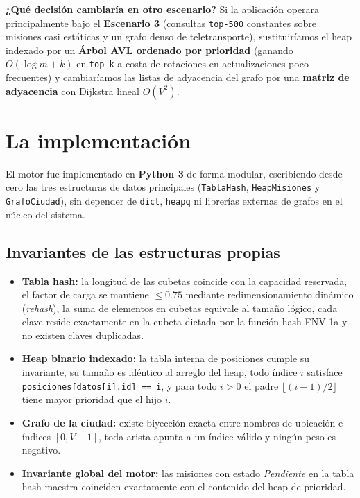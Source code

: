 \documentclass[11pt,a4paper]{article}
\begin{document}
\textbf{¿Qué decisión cambiaría en otro escenario?} Si la aplicación operara principalmente bajo el \textbf{Escenario 3} (consultas \texttt{top-500} constantes sobre misiones casi estáticas y un grafo denso de teletransporte), sustituiríamos el heap indexado por un \textbf{Árbol AVL ordenado por prioridad} (ganando $O(\log m + k)$ en \texttt{top-k} a costa de rotaciones en actualizaciones poco frecuentes) y cambiaríamos las listas de adyacencia del grafo por una \textbf{matriz de adyacencia} con Dijkstra lineal $O(V^2)$.

\section{La implementación}

El motor fue implementado en \textbf{Python 3} de forma modular, escribiendo desde cero las tres estructuras de datos principales (\texttt{TablaHash}, \texttt{HeapMisiones} y \texttt{GrafoCiudad}), sin depender de \texttt{dict}, \texttt{heapq} ni librerías externas de grafos en el núcleo del sistema.

\subsection{Invariantes de las estructuras propias}
\begin{itemize}
  \item \textbf{Tabla hash:} la longitud de las cubetas coincide con la capacidad reservada, el factor de carga se mantiene $\le 0.75$ mediante redimensionamiento dinámico (\textit{rehash}), la suma de elementos en cubetas equivale al tamaño lógico, cada clave reside exactamente en la cubeta dictada por la función hash FNV-1a y no existen claves duplicadas.
  \item \textbf{Heap binario indexado:} la tabla interna de posiciones cumple su invariante, su tamaño es idéntico al arreglo del heap, todo índice $i$ satisface \texttt{posiciones[datos[i].id] == i}, y para todo $i > 0$ el padre $\lfloor(i-1)/2\rfloor$ tiene mayor prioridad que el hijo $i$.
  \item \textbf{Grafo de la ciudad:} existe biyección exacta entre nombres de ubicación e índices $[0, V-1]$, toda arista apunta a un índice válido y ningún peso es negativo.
  \item \textbf{Invariante global del motor:} las misiones con estado \textit{Pendiente} en la tabla hash maestra coinciden exactamente con el contenido del heap de prioridad.
\end{itemize}
\end{document}
